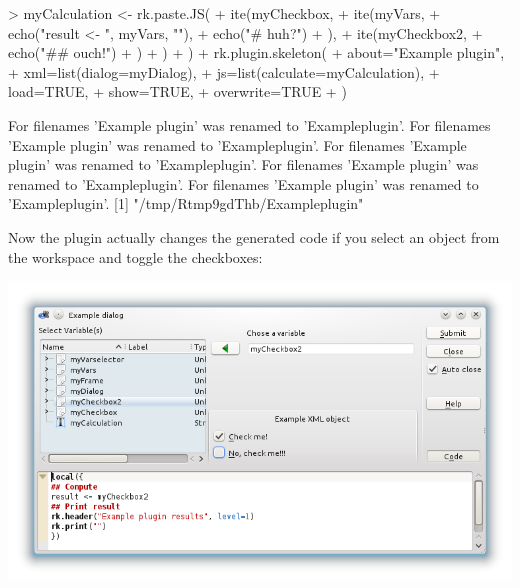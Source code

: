 \documentclass[a4paper,10pt]{scrartcl}
\begin{document}
	\begin{Schunk}
		\begin{Sinput}
> myCalculation <- rk.paste.JS(
+   ite(myCheckbox,
+     ite(myVars,
+       echo("result <- ", myVars, "\n"),
+       echo("# huh?\n")
+     ),
+     ite(myCheckbox2,
+       echo("## ouch!\n")
+     )
+   )
+ )
+ rk.plugin.skeleton(
+   about="Example plugin",
+   xml=list(dialog=myDialog),
+   js=list(calculate=myCalculation),
+   load=TRUE,
+   show=TRUE,
+   overwrite=TRUE
+ )
		\end{Sinput}
		\begin{Soutput}
For filenames 'Example plugin' was renamed to 'Exampleplugin'.
For filenames 'Example plugin' was renamed to 'Exampleplugin'.
For filenames 'Example plugin' was renamed to 'Exampleplugin'.
For filenames 'Example plugin' was renamed to 'Exampleplugin'.
For filenames 'Example plugin' was renamed to 'Exampleplugin'.
[1] "/tmp/Rtmp9gdThb/Exampleplugin"
		\end{Soutput}
	\end{Schunk}

Now the plugin actually changes the generated code if you select an object from the workspace and toggle the checkboxes:

\begin{center}
 \includegraphics{./RKWard_vign_example_dialog_wcode_JS.png}
\end{center}

% 
% 
% 


%  
%  
\end{document}
